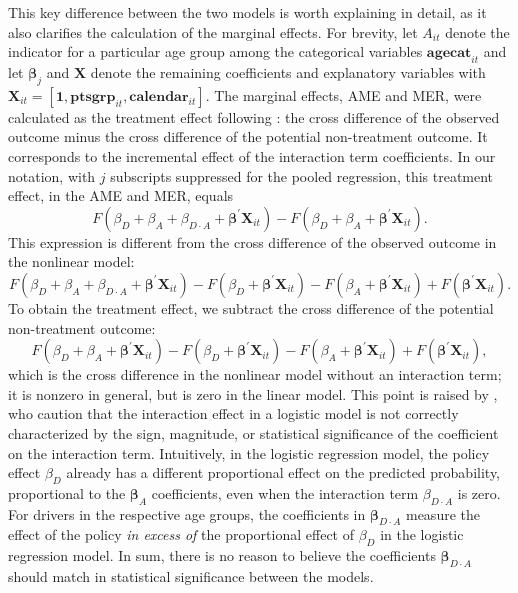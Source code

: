 This key difference between the two models is worth explaining in detail, 
as it also clarifies the calculation of the marginal effects. 
%
For brevity, let $A_{it}$ denote the indicator for a particular age group 
among the categorical variables $\bm{agecat}_{it}$
and let $\bm{\beta}_j$ and $\bm{X}$ denote 
the remaining coefficients and explanatory variables 
with $\bm{X}_{it} = [\bm{1}, \bm{ptsgrp}_{it}, \bm{calendar}_{it}]$. 
% 
The marginal effects, AME and MER, 
were calculated as the treatment effect following \citet{puhani2012}:
the cross difference of the observed outcome 
minus the cross difference of the potential non-treatment outcome. It corresponds to the incremental effect of the interaction term coefficients. 
In our notation, with $j$ subscripts suppressed for the pooled regression, 
this treatment effect, in the AME and MER, equals
$$
	F(\beta_D + \beta_A + \beta_{D\cdot A} + \bm{\beta}^\prime \bm{X}_{it})
		- F(\beta_D + \beta_A + \bm{\beta}^\prime \bm{X}_{it}).
$$
This expression is different from the cross difference of the observed outcome in the nonlinear model: 
$$
	F(\beta_D + \beta_A + \beta_{D\cdot A} + \bm{\beta}^\prime \bm{X}_{it})
		- F(\beta_D + \bm{\beta}^\prime \bm{X}_{it})
		- F(\beta_A + \bm{\beta}^\prime \bm{X}_{it})
		+ F(\bm{\beta}^\prime \bm{X}_{it}).
$$
To obtain the treatment effect, we subtract 
the cross difference of the potential non-treatment outcome:
$$
	F(\beta_D + \beta_A + \bm{\beta}^\prime \bm{X}_{it})
		- F(\beta_D + \bm{\beta}^\prime \bm{X}_{it})
		- F(\beta_A + \bm{\beta}^\prime \bm{X}_{it})
		+ F(\bm{\beta}^\prime \bm{X}_{it}), 
$$
which is the cross difference in the nonlinear model 
without an interaction term; it is nonzero in general, 
but is zero in the linear model. 
% 
This point is raised by  
\citet{ainorton2003}, who caution that 
the interaction effect in a logistic model 
is not correctly characterized by the
sign, magnitude, or statistical significance of the coefficient on the
interaction term.
Intuitively, in the logistic regression model, the policy effect $\beta_D$
already has a different proportional effect on the predicted probability, 
proportional to the $\bm{\beta}_A$ coefficients, 
even when the interaction term $\beta_{D\cdot A}$ is zero. 
For drivers in the respective age groups,
the coefficients in $\bm{\beta}_{D\cdot A}$ measure the effect of the policy
\emph{in excess of} the proportional effect of $\beta_D$
in the logistic regression model. 
In sum, there is no reason to believe the coefficients $\bm{\beta}_{D\cdot A}$
should match in statistical significance between the models. 

